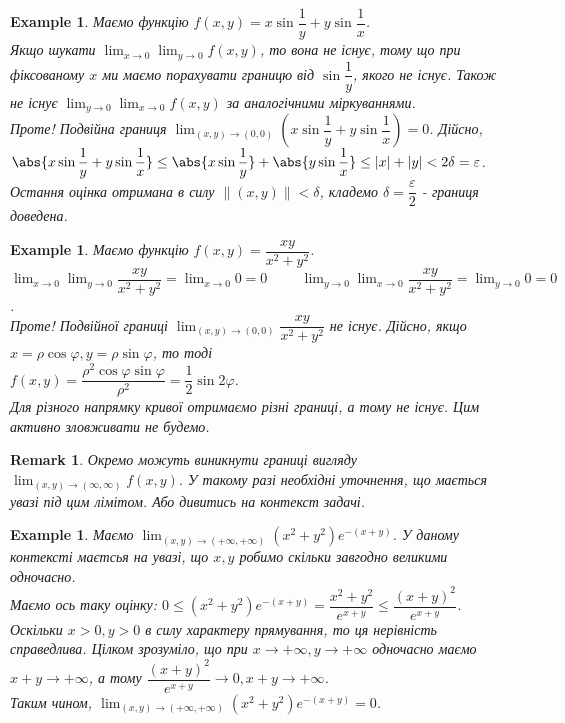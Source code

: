 \documentclass[a4paper, 10pt]{article}
\def\huge{\displaystyle}
\theoremstyle{theoremdd}
\theoremstyle{theoremdd}
\theoremstyle{theoremdd}
\theoremstyle{theoremdd}
\theoremstyle{theoremdd}
\newtheorem{example}[theorem]{Example}
\theoremstyle{theoremdd}
\theoremstyle{theoremdd}
\newtheorem{remark}[theorem]{Remark}
\theoremstyle{theoremdd}
\theoremstyle{theoremdd}
\newcommand\Norm[1]{\lVert#1\rVert}
\begin{document}
\begin{example}
Маємо функцію $f(x,y) = x \sin \dfrac{1}{y} + y \sin \dfrac{1}{x}$.\\
Якщо шукати $\huge\lim_{x \to 0} \lim_{y \to 0} f(x,y)$, то вона не існує, тому що при фіксованому $x$ ми маємо порахувати границю від $\sin \dfrac{1}{y}$, якого не існує. Також не існує $\huge\lim_{y \to 0} \lim_{x \to 0} f(x,y)$ за аналогічними міркуваннями.\\
Проте! Подвійна границя $\huge\lim_{(x,y) \to (0,0)} \left( x \sin \dfrac{1}{y} + y \sin \dfrac{1}{x} \right) = 0$. Дійсно,\\
$\abs{x \sin \dfrac{1}{y} + y \sin \dfrac{1}{x}} \leq \abs{x \sin \dfrac{1}{y}} + \abs{y \sin \dfrac{1}{x}} \leq |x| + |y| < 2 \delta = \varepsilon$.\\
Остання оцінка отримана в силу $\Norm{(x,y)} < \delta$, кладемо $\delta = \dfrac{\varepsilon}{2}$ - границя доведена.
\end{example}

\begin{example}
Маємо функцію $f(x,y) = \dfrac{xy}{x^2+y^2}$.\\
$\huge\lim_{x \to 0} \lim_{y \to 0} \dfrac{xy}{x^2+y^2} = \lim_{x \to 0} 0 = 0 \hspace{1cm} \huge\lim_{y \to 0} \lim_{x \to 0} \dfrac{xy}{x^2+y^2} = \lim_{y \to 0} 0 = 0$.\\
Проте! Подвійної границі $\huge\lim_{(x,y) \to (0,0)} \dfrac{xy}{x^2+y^2}$ не існує. Дійсно, якщо $x = \rho \cos \varphi, y = \rho \sin \varphi$, то тоді\\
$f(x,y) = \dfrac{\rho^2 \cos \varphi \sin \varphi}{\rho^2} = \dfrac{1}{2} \sin 2 \varphi$.\\
Для різного напрямку кривої отримаємо різні границі, а тому не існує. Цим активно зловживати не будемо.
\end{example}

\begin{remark}
Окремо можуть виникнути границі вигляду $\displaystyle\lim_{(x,y) \to (\infty,\infty)} f(x,y)$. У такому разі необхідні уточнення, що мається увазі під цим лімітом. Або дивитись на контекст задачі.
\end{remark}

\begin{example}
Маємо $\displaystyle\lim_{(x,y) \to (+\infty,+\infty)} (x^2+y^2) e^{-(x+y)}$. У даному контексті маєтсья на увазі, що $x,y$ робимо скільки завгодно великими одночасно.\\
Маємо ось таку оцінку: $0 \leq (x^2+y^2)e^{-(x+y)} = \dfrac{x^2+y^2}{e^{x+y}} \leq \dfrac{(x+y)^2}{e^{x+y}}$.\\
Оскільки $x>0,y>0$ в силу характеру прямування, то ця нерівність справедлива. Цілком зрозуміло, що при $x \to +\infty, y \to +\infty$ одночасно маємо $x+y \to +\infty$, а тому $\dfrac{(x+y)^2}{e^{x+y}} \to 0, x+y \to +\infty$.\\
Таким чином, $\displaystyle\lim_{(x,y) \to (+\infty,+\infty)} (x^2+y^2) e^{-(x+y)} = 0$.
\end{example}
\end{document}

